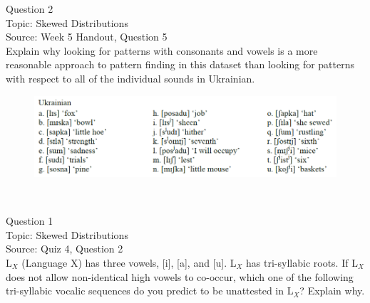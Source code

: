 \documentclass[12pt]{article}
\begin{document}
\newpage

{\large Question 2}\\

Topic: Skewed Distributions\\
Source: Week 5 Handout, Question 5\\

Explain why looking for patterns with consonants and vowels is a more reasonable approach to pattern finding in this dataset than looking for patterns with respect to all of the individual sounds in Ukrainian.\\

\begin{figure}[H]
\includegraphics{../images/ukrainian.png}
\end{figure}

\newpage

\begin{center}
\textbf{{\color{red}{\HUGE END OF EXAM}}}\\

\end{center}
\newpage

\begin{center}
\textbf{{\color{blue}{\HUGE START OF EXAM\\}}}

\textbf{{\color{blue}{\HUGE Student ID: 36593\\}}}

\textbf{{\color{blue}{\HUGE 4:50\\}}}

\end{center}
\newpage

{\large Question 1}\\

Topic: Skewed Distributions\\
Source: Quiz 4, Question 2\\

L$_X$ (Language X) has three vowels, [i], [a], and [u]. L$_X$ has tri-syllabic roots. If L$_X$ does not allow non-identical high vowels to co-occur, which one of the following tri-syllabic vocalic sequences do you predict to be unattested in L$_X$? Explain why.\\
\end{document}
